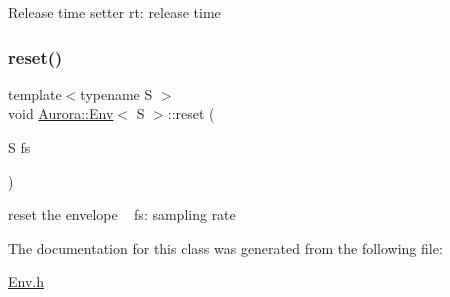 Release time setter rt\+: release time \mbox{\label{class_aurora_1_1_env_ac97ef83c828c1ebf2527be51f457eab8}} 
\subsubsection{\texorpdfstring{reset()}{reset()}}
{\footnotesize\ttfamily template$<$typename S $>$ \\
void \hyperlink{class_aurora_1_1_env}{Aurora\+::\+Env}$<$ S $>$\+::reset (\begin{DoxyParamCaption}\item[{S}]{fs }\end{DoxyParamCaption})\hspace{0.3cm}{\ttfamily [inline]}}

reset the envelope ~\newline
fs\+: sampling rate 

The documentation for this class was generated from the following file\+:\begin{DoxyCompactItemize}
\item 
\hyperlink{_env_8h}{Env.\+h}\end{DoxyCompactItemize}
